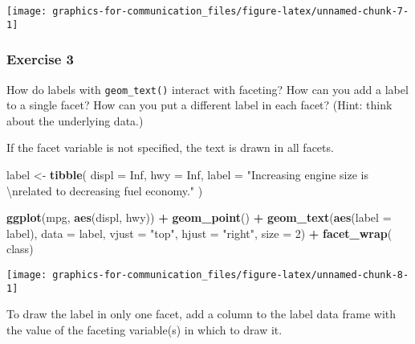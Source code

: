 \documentclass[]{book}
\newenvironment{Shaded}{\begin{snugshade}}{\end{snugshade}}
\newcommand{\CharTok}[1]{\textcolor[rgb]{0.31,0.60,0.02}{#1}}
\newcommand{\DataTypeTok}[1]{\textcolor[rgb]{0.13,0.29,0.53}{#1}}
\newcommand{\DecValTok}[1]{\textcolor[rgb]{0.00,0.00,0.81}{#1}}
\newcommand{\KeywordTok}[1]{\textcolor[rgb]{0.13,0.29,0.53}{\textbf{#1}}}
\newcommand{\NormalTok}[1]{#1}
\newcommand{\OperatorTok}[1]{\textcolor[rgb]{0.81,0.36,0.00}{\textbf{#1}}}
\newcommand{\OtherTok}[1]{\textcolor[rgb]{0.56,0.35,0.01}{#1}}
\newcommand{\StringTok}[1]{\textcolor[rgb]{0.31,0.60,0.02}{#1}}
\theoremstyle{plain}
\theoremstyle{remark}
\theoremstyle{definition}
\theoremstyle{definition}
\theoremstyle{definition}
\theoremstyle{remark}
\begin{document}
\begin{center}\texttt{[image: graphics-for-communication\_files/figure-latex/unnamed-chunk-7-1]} \end{center}

\hypertarget{exercise-3-59}{%
\subsubsection{Exercise 3}\label{exercise-3-59}}

How do labels with \texttt{geom\_text()} interact with faceting? How can
you add a label to a single facet? How can you put a different label in
each facet? (Hint: think about the underlying data.)

If the facet variable is not specified, the text is drawn in all facets.

\begin{Shaded}
\begin{Highlighting}[]
\NormalTok{label <-}\StringTok{ }\KeywordTok{tibble}\NormalTok{(}
  \DataTypeTok{displ =} \OtherTok{Inf}\NormalTok{,}
  \DataTypeTok{hwy =} \OtherTok{Inf}\NormalTok{,}
  \DataTypeTok{label =} \StringTok{"Increasing engine size is }\CharTok{\textbackslash{}n}\StringTok{related to decreasing fuel economy."}
\NormalTok{)}

\KeywordTok{ggplot}\NormalTok{(mpg, }\KeywordTok{aes}\NormalTok{(displ, hwy)) }\OperatorTok{+}
\StringTok{  }\KeywordTok{geom_point}\NormalTok{() }\OperatorTok{+}
\StringTok{  }\KeywordTok{geom_text}\NormalTok{(}\KeywordTok{aes}\NormalTok{(}\DataTypeTok{label =}\NormalTok{ label), }\DataTypeTok{data =}\NormalTok{ label, }\DataTypeTok{vjust =} \StringTok{"top"}\NormalTok{, }\DataTypeTok{hjust =} \StringTok{"right"}\NormalTok{,}
            \DataTypeTok{size =} \DecValTok{2}\NormalTok{) }\OperatorTok{+}
\StringTok{  }\KeywordTok{facet_wrap}\NormalTok{(}\OperatorTok{~}\StringTok{ }\NormalTok{class)}
\end{Highlighting}
\end{Shaded}

\begin{center}\texttt{[image: graphics-for-communication\_files/figure-latex/unnamed-chunk-8-1]} \end{center}

To draw the label in only one facet, add a column to the label data
frame with the value of the faceting variable(s) in which to draw it.
\end{document}
